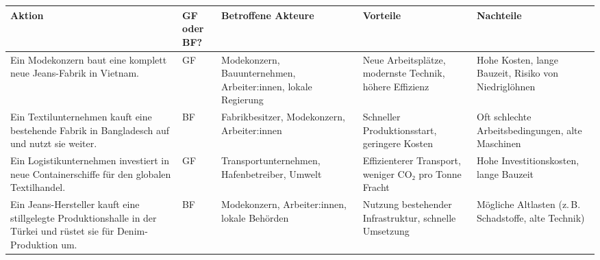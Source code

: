\begin{myexercise}
\begin{table}[H]
\begin{tabular}{p{3cm}||p{1cm}|p{3.5cm}|p{3cm}|p{3cm}}
        \end{tabular}
    \end{table}

    \begin{myanswer}
        \begin{table}[H]
            \centering
            \footnotesize
            \begin{tabular}{p{3cm}||p{1cm}|p{2.7cm}|p{2.7cm}|p{3cm}}
                \textbf{Aktion}                                                                                                     & \textbf{GF oder BF?} & \textbf{Betroffene Akteure}                                   & \textbf{Vorteile}                                       & \textbf{Nachteile}                                   \\
                \midrule\midrule
                Ein Modekonzern baut eine komplett neue Jeans-Fabrik in Vietnam.                                                    & GF                   & Modekonzern, Bauunternehmen, Arbeiter:innen, lokale Regierung & Neue Arbeitsplätze, modernste Technik, höhere Effizienz & Hohe Kosten, lange Bauzeit, Risiko von Niedriglöhnen \\\midrule
                Ein Textilunternehmen kauft eine bestehende Fabrik in Bangladesch auf und nutzt sie weiter.                         & BF                   & Fabrikbesitzer, Modekonzern, Arbeiter:innen                   & Schneller Produktionsstart, geringere Kosten            & Oft schlechte Arbeitsbedingungen, alte Maschinen     \\\midrule
                Ein Logistikunternehmen investiert in neue Containerschiffe für den globalen Textilhandel.                          & GF                   & Transportunternehmen, Hafenbetreiber, Umwelt                  & Effizienterer Transport, weniger CO₂ pro Tonne Fracht   & Hohe Investitionskosten, lange Bauzeit               \\\midrule
                Ein Jeans-Hersteller kauft eine stillgelegte Produktionshalle in der Türkei und rüstet sie für Denim-Produktion um. & BF                   & Modekonzern, Arbeiter:innen, lokale Behörden                  & Nutzung bestehender Infrastruktur, schnelle Umsetzung   & Mögliche Altlasten (z. B. Schadstoffe, alte Technik) \\%

\end{tabular}
\end{table}
\end{myanswer}
\end{myexercise}
